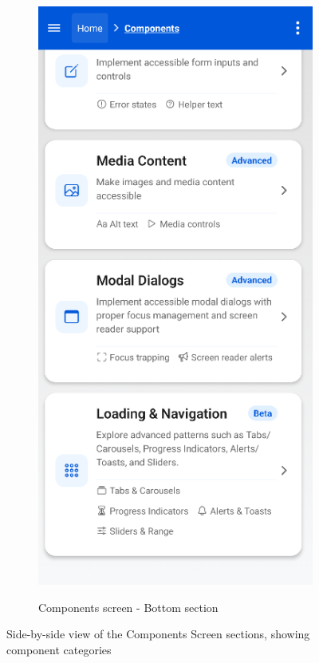 \begin{figure}[ht]
\begin{subfigure}[b]{0.48\textwidth}
        \centering
        \includegraphics[width=\linewidth, alt={Second part of the Components Screen}]{img/components2.png}
        \caption{Components screen - Bottom section}
        \label{fig:components-bottom}
    \end{subfigure}
    \caption{Side-by-side view of the Components Screen sections, showing component categories}
    \label{fig:components_screens_sidebyside}
\end{figure}

